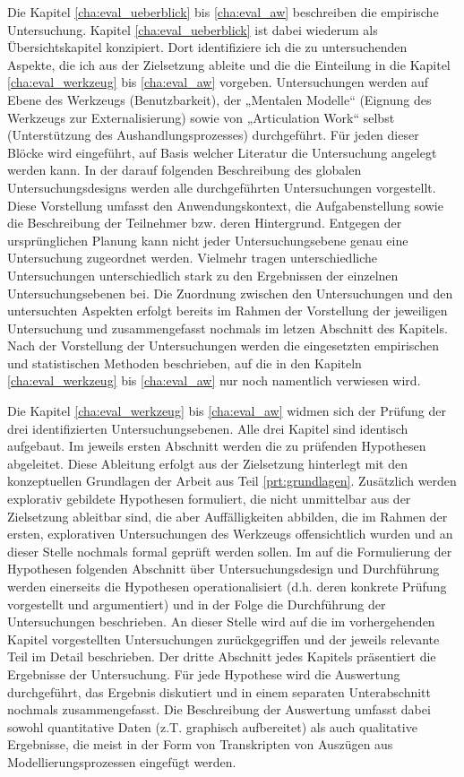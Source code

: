 Die Kapitel \ref{cha:eval_ueberblick} bis \ref{cha:eval_aw} beschreiben die empirische Untersuchung. Kapitel \ref{cha:eval_ueberblick} ist dabei wiederum als Übersichtskapitel konzipiert. Dort identifiziere ich die zu untersuchenden Aspekte, die ich aus der Zielsetzung ableite und die die Einteilung in die Kapitel \ref{cha:eval_werkzeug} bis \ref{cha:eval_aw} vorgeben. Untersuchungen werden auf Ebene des Werkzeugs (Benutzbarkeit), der „Mentalen Modelle“ (Eignung des Werkzeugs zur Externalisierung) sowie von „Articulation Work“ selbst (Unterstützung des Aushandlungsprozesses) durchgeführt. Für jeden dieser Blöcke wird eingeführt, auf Basis welcher Literatur die Untersuchung angelegt werden kann. In der darauf folgenden Beschreibung des globalen Untersuchungsdesigns werden alle durchgeführten Untersuchungen vorgestellt. Diese Vorstellung umfasst den Anwendungskontext, die Aufgabenstellung sowie die Beschreibung der Teilnehmer bzw. deren Hintergrund. Entgegen der ursprünglichen Planung kann nicht jeder Untersuchungsebene genau eine Untersuchung zugeordnet werden. Vielmehr tragen unterschiedliche Untersuchungen unterschiedlich stark zu den Ergebnissen der einzelnen Untersuchungsebenen bei. Die Zuordnung zwischen den Untersuchungen und den untersuchten Aspekten erfolgt bereits im Rahmen der Vorstellung der jeweiligen Untersuchung und zusammengefasst nochmals im letzen Abschnitt des Kapitels. Nach der Vorstellung der Untersuchungen werden die eingesetzten empirischen und statistischen Methoden beschrieben, auf die in den Kapiteln \ref{cha:eval_werkzeug} bis \ref{cha:eval_aw} nur noch namentlich verwiesen wird.

Die Kapitel \ref{cha:eval_werkzeug} bis \ref{cha:eval_aw} widmen sich der Prüfung der drei identifizierten Untersuchungsebenen. Alle drei Kapitel sind identisch aufgebaut. Im jeweils ersten Abschnitt werden die zu prüfenden Hypothesen abgeleitet. Diese Ableitung erfolgt aus der Zielsetzung hinterlegt mit den konzeptuellen Grundlagen der Arbeit aus Teil \ref{prt:grundlagen}. Zusätzlich werden explorativ gebildete Hypothesen formuliert, die nicht unmittelbar aus der Zielsetzung ableitbar sind, die aber Auffälligkeiten abbilden, die im Rahmen der ersten, explorativen Untersuchungen des Werkzeugs offensichtlich wurden und an dieser Stelle nochmals formal geprüft werden sollen. Im auf die Formulierung der Hypothesen folgenden Abschnitt über Untersuchungsdesign und Durchführung werden einerseits die Hypothesen operationalisiert (d.h. deren konkrete Prüfung vorgestellt und argumentiert) und in der Folge die Durchführung der Untersuchungen beschrieben. An dieser Stelle wird auf die im vorhergehenden Kapitel vorgestellten Untersuchungen zurückgegriffen und der jeweils relevante Teil im Detail beschrieben. Der dritte Abschnitt jedes Kapitels präsentiert die Ergebnisse der Untersuchung. Für jede Hypothese wird die Auswertung durchgeführt, das Ergebnis diskutiert und in einem separaten Unterabschnitt nochmals zusammengefasst. Die Beschreibung der Auswertung umfasst dabei sowohl quantitative Daten (z.T. graphisch aufbereitet) als auch qualitative Ergebnisse, die meist in der Form von Transkripten von Auszügen aus Modellierungsprozessen eingefügt werden.

